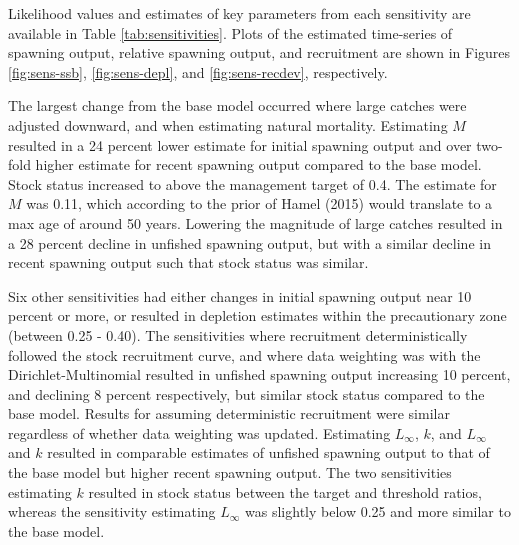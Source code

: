 \documentclass[11pt,
  english,
  a4paper,
]{article}
\begin{document}
Likelihood values and estimates of key parameters from each sensitivity are available in Table \ref{tab:sensitivities}. Plots of the estimated time-series of spawning output, relative spawning output, and recruitment are shown in Figures \ref{fig:sens-ssb}, \ref{fig:sens-depl}, and \ref{fig:sens-recdev}, respectively.

\leavevmode\tagmcend\tagstructend\par


The largest change from the base model occurred where large catches were adjusted downward, and when estimating natural mortality. Estimating {\(M\)\leavevmode\tagmcend\tagstructend} resulted in a 24 percent lower estimate for initial spawning output and over two-fold higher estimate for recent spawning output compared to the base model. Stock status increased to above the management target of 0.4. The estimate for {\(M\)\leavevmode\tagmcend\tagstructend} was 0.11, which according to the prior of Hamel {(2015)\leavevmode\tagmcend\tagstructend} would translate to a max age of around 50 years. Lowering the magnitude of large catches resulted in a 28 percent decline in unfished spawning output, but with a similar decline in recent spawning output such that stock status was similar.

\leavevmode\tagmcend\tagstructend\par


Six other sensitivities had either changes in initial spawning output near 10 percent or more, or resulted in depletion estimates within the precautionary zone (between 0.25 - 0.40). The sensitivities where recruitment deterministically followed the stock recruitment curve, and where data weighting was with the Dirichlet-Multinomial resulted in unfished spawning output increasing 10 percent, and declining 8 percent respectively, but similar stock status compared to the base model. Results for assuming deterministic recruitment were similar regardless of whether data weighting was updated. Estimating {\(L_{\infty}\)\leavevmode\tagmcend\tagstructend}, {\(k\)\leavevmode\tagmcend\tagstructend}, and {\(L_{\infty}\)\leavevmode\tagmcend\tagstructend} and {\(k\)\leavevmode\tagmcend\tagstructend} resulted in comparable estimates of unfished spawning output to that of the base model but higher recent spawning output. The two sensitivities estimating {\(k\)\leavevmode\tagmcend\tagstructend} resulted in stock status between the target and threshold ratios, whereas the sensitivity estimating {\(L_{\infty}\)\leavevmode\tagmcend\tagstructend} was slightly below 0.25 and more similar to the base model.
\end{document}
